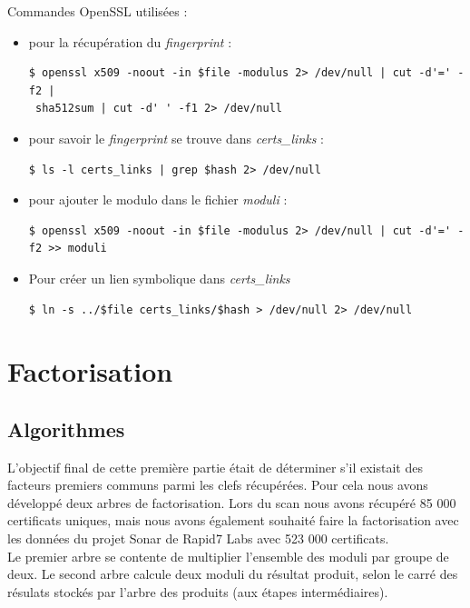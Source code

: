 Commandes OpenSSL utilisées :
\begin{itemize}
\item pour la récupération du \textit{fingerprint} :
\begin{verbatim} 
$ openssl x509 -noout -in $file -modulus 2> /dev/null | cut -d'=' -f2 |
 sha512sum | cut -d' ' -f1 2> /dev/null 
\end{verbatim}

\item pour savoir le \textit{fingerprint} se trouve dans \textit{certs\_links} :
\begin{verbatim} 
$ ls -l certs_links | grep $hash 2> /dev/null
\end{verbatim}

\item pour ajouter le modulo dans le fichier \textit{moduli} :
\begin{verbatim} 
$ openssl x509 -noout -in $file -modulus 2> /dev/null | cut -d'=' -f2 >> moduli 
\end{verbatim}

\item Pour créer un lien symbolique dans \textit{certs\_links}
\begin{verbatim} 
$ ln -s ../$file certs_links/$hash > /dev/null 2> /dev/null
\end{verbatim}
\end{itemize}


\section{Factorisation}



\subsection{Algorithmes}

L'objectif final de cette première partie était de déterminer s'il existait des facteurs premiers communs parmi les clefs récupérées. Pour cela nous avons développé deux arbres de factorisation.
Lors du scan nous avons récupéré 85 000 certificats uniques, mais nous avons également souhaité faire la factorisation avec les données du projet Sonar de Rapid7 Labs avec 523 000 certificats.\\


Le premier arbre se contente de multiplier l'ensemble des moduli par groupe de deux.
Le second arbre calcule deux moduli du résultat produit, selon le carré des résulats stockés par l'arbre des produits (aux étapes intermédiaires).\\


